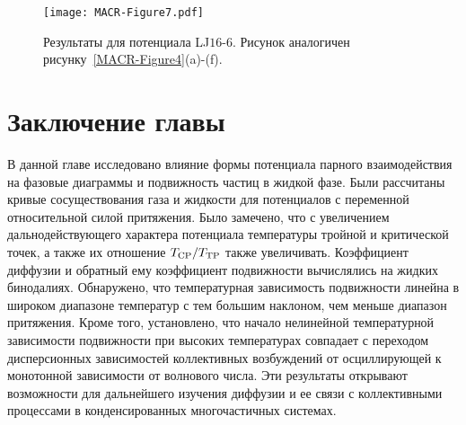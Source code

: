 \begin{figure}
\centering
 \texttt{[image: MACR-Figure7.pdf]}
 \caption{Результаты для потенциала LJ$16$-$6$. Рисунок аналогичен рисунку~\ref{MACR-Figure4}(a)-(f).}
\label{MACR-Figure7}
\end{figure}


\section{Заключение главы}
\label{MACR-SecConclusions}

В данной главе исследовано влияние формы потенциала парного взаимодействия на фазовые диаграммы и подвижность частиц в жидкой фазе. Были рассчитаны кривые сосуществования газа и жидкости для потенциалов с переменной относительной силой притяжения. Было замечено, что с увеличением дальнодействующего характера потенциала температуры тройной и критической точек, а также их отношение $T_{\rm CP}/T_{\rm TP}$ также увеличивать. Коэффициент диффузии и обратный ему коэффициент подвижности вычислялись на жидких бинодалиях. Обнаружено, что температурная зависимость подвижности линейна в широком диапазоне температур с тем большим наклоном, чем меньше диапазон притяжения. Кроме того, установлено, что начало нелинейной температурной зависимости подвижности при высоких температурах совпадает с переходом дисперсионных зависимостей коллективных возбуждений от осциллирующей к монотонной зависимости от волнового числа. Эти результаты открывают возможности для дальнейшего изучения диффузии и ее связи с коллективными процессами в конденсированных многочастичных системах.


